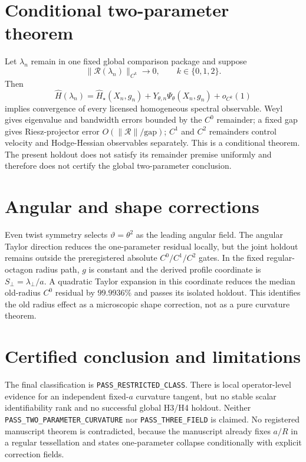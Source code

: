 \documentclass[11pt]{article}
\begin{document}
\section{Conditional two-parameter theorem}
Let $\lambda_n$ remain in one fixed global comparison package and suppose
\[
 \|\mathcal R(\lambda_n)\|_{C^k}\to0,\qquad k\in\{0,1,2\}.
\]
Then
\[
 \widehat H(\lambda_n)=\widehat H_\star(X_n,g_n)
 +Y_{\theta,n}\Psi_\theta(X_n,g_n)+o_{C^k}(1)
\]
implies convergence of every licensed homogeneous spectral observable.  Weyl
gives eigenvalue and bandwidth errors bounded by the $C^0$ remainder; a fixed
gap gives Riesz-projector error $O(\|\mathcal R\|/\mathrm{gap})$; $C^1$ and
$C^2$ remainders control velocity and Hodge-Hessian observables separately.
This is a conditional theorem.  The present holdout does not satisfy its
remainder premise uniformly and therefore does not certify the global
two-parameter conclusion.

\section{Angular and shape corrections}
Even twist symmetry selects $\vartheta=\theta^2$ as the leading angular field.
The angular Taylor direction reduces the one-parameter residual locally, but
the joint holdout remains outside the preregistered absolute $C^0/C^1/C^2$
gates.  In the fixed regular-octagon radius path, $g$ is constant and the
derived profile coordinate is $S_\perp=\lambda_\perp/a$.  A quadratic Taylor
expansion in this coordinate reduces the median old-radius $C^0$ residual by
$99.9936\%$ and passes its isolated holdout.  This identifies the old radius
effect as a microscopic shape correction, not as a pure curvature theorem.

\section{Certified conclusion and limitations}
The final classification is \texttt{PASS\_RESTRICTED\_CLASS}.  There is local
operator-level evidence for an independent fixed-$a$ curvature tangent, but no
stable scalar identifiability rank and no successful global H3/H4 holdout.
Neither \texttt{PASS\_TWO\_PARAMETER\_CURVATURE} nor
\texttt{PASS\_THREE\_FIELD} is claimed.  No registered manuscript theorem is
contradicted, because the manuscript already fixes $a/R$ in a regular
tessellation and states one-parameter collapse conditionally with explicit
correction fields.
\end{document}
